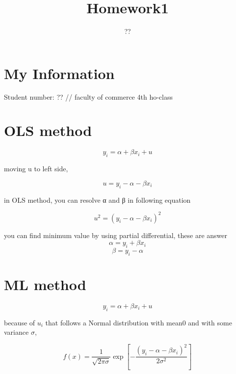\documentclass[dvipdfmx]{jsarticle}
\begin{document}
\title{Homework1}
\author{??}
\maketitle

\section{My Information}
Student number: ??
//
faculty of commerce 4th
ho-class
\section{OLS method}


\begin{equation}
  y_i = α + βx_i + u
\end{equation}

moving u to left side,

\begin{equation}
  u = y_i - α - βx_i
\end{equation}

in OLS method, you can resolve α and β in following equation


\begin{equation}
  u^2 = (y_i - α - βx_i)^2
\end{equation}

you can find minimum value by using partial differential, these are answer
\begin{equation}
  α = y_i + βx_i
\end{equation}
\begin{equation}
  β = y_i - α
\end{equation}





\section{ML method}

\begin{equation}
  y_i = α + βx_i + u
\end{equation}

because of  $u_i$ that follows a Normal distribution with mean0 and with some variance $σ$,

\begin{equation}
  f(x)=\dfrac{1}{\sqrt{2\pi\sigma}}\exp[-\dfrac{(y_i - α - βx_i)^2}{2\sigma^ 2}]
\end{equation}
\end{document}
